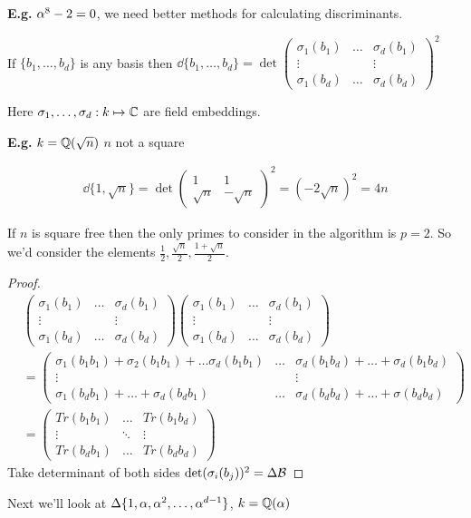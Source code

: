 \documentclass[11pt]{article}
\begin{document}
\textbf{E.g.} $\alpha^8 - 2 = 0$, we need better methods for calculating discriminants.

\begin{lemma}
	If $\{b_1, \dots, b_d\}$ is any basis then $\dd \{b_1, \dots, b_d \} = \det \begin{pmatrix}
		\sigma_1(b_1) &\dots & \sigma_d(b_1)\\
		\vdots && \vdots\\
		\sigma_1(b_d) &\dots & \sigma_d(b_d)
	\end{pmatrix}^2$

	Here $\sigma_1, \dots, \sigma_d : k \mapsto \mathbb{C} $ are field embeddings.
\end{lemma}
\textbf{E.g.} $k= \mathbb{Q}(\sqrt{n})$ $n$ not a square

\begin{align*}
	\dd\{1,\sqrt{n}\} = \det \begin{pmatrix}
	1&1\\
		\sqrt{n}&-\sqrt{n}
	\end{pmatrix}^2 = (-2\sqrt{n})^2 = 4n
\end{align*}

If $n$ is square free then the only primes to consider in the algorithm is $p=2$. 
So we'd consider the elements $\frac{1}{2} ,\frac{\sqrt{n}}2, \frac{1+\sqrt{n}}2$.


\begin{proof}
	\begin{align*}
		&
		\begin{pmatrix}
			\sigma_1(b_1) &\dots & \sigma_d(b_1)\\
			\vdots && \vdots\\
			\sigma_1(b_d) &\dots & \sigma_d(b_d)
		\end{pmatrix}
		\begin{pmatrix}
			\sigma_1(b_1) &\dots & \sigma_d(b_1)\\
			\vdots && \vdots\\
			\sigma_1(b_d) &\dots & \sigma_d(b_d)
		\end{pmatrix} 
		\\[2em]
		& = \begin{pmatrix}
			\sigma_1(b_1b_1) + \sigma_2(b_1b_1) + \dots \sigma_d(b_1b_1)  &\dots & \sigma_d(b_1b_d) + \dots + \sigma_d(b_1b_d) \\
			\vdots && \vdots\\
			\sigma_1(b_db_1) + \dots + \sigma_d(b_db_1) &\dots & \sigma_d(b_db_d) + \dots + \sigma(b_db_d)
		\end{pmatrix}
		\\[2em]
		& =\begin{pmatrix}
			Tr(b_1b_1)  & \dots & Tr(b_1 b_d)\\
			\vdots &\ddots& \vdots\\
			Tr(b_db_1) &\dots & Tr(b_db_d)
		\end{pmatrix} 
	\end{align*}
	Take determinant of both sides $\det (\sigma_i(b_j))^2 = \Delta \mathcal{B}$
\end{proof}
\spa
Next we'll look at $\Delta \{1, \alpha, \alpha^2, \dots, \alpha^{d-1} \}$, $k = \mathbb{Q}(\alpha)$
\end{document}
